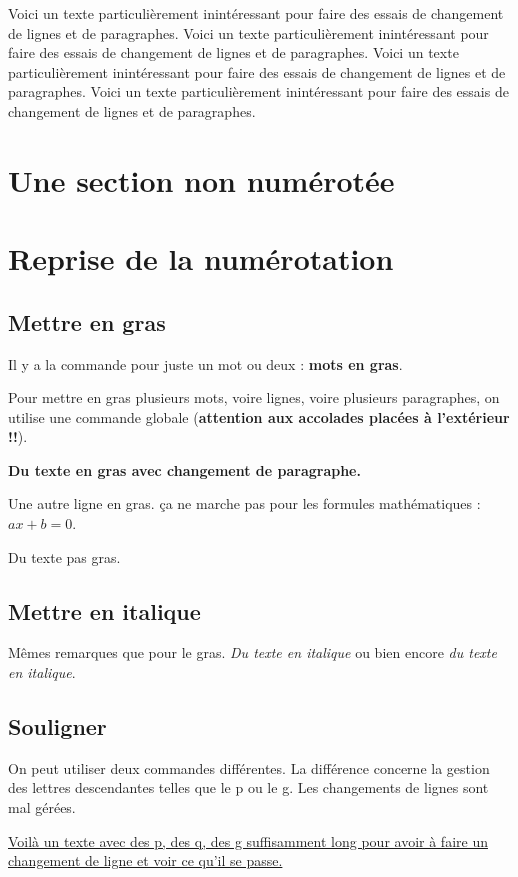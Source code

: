 \documentclass[10pt,frenchb]{book} %
\begin{document}
\noindent Voici un texte particulièrement inintéressant pour faire des essais de changement de lignes et de paragraphes. Voici un texte particulièrement inintéressant pour faire des essais de changement de lignes et de paragraphes. Voici un texte particulièrement inintéressant pour faire des essais de changement de lignes et de paragraphes. Voici un texte particulièrement inintéressant pour faire des essais de changement de lignes et de paragraphes. %

\section*{Une section non numérotée}

\section{Reprise de la numérotation}
\subsection{Mettre en gras}

Il y a la commande pour juste un mot ou deux : \textbf{mots en gras}.

Pour mettre en gras plusieurs mots, voire lignes, voire plusieurs paragraphes, on utilise une commande globale (\textbf{attention aux accolades placées à l'extérieur !!}).

{\bfseries
Du texte en gras avec changement de paragraphe.\par
Une autre ligne en gras. ça ne marche pas pour les formules mathématiques : $ax + b = 0$.
} Du texte pas gras. %

\subsection{Mettre en italique}

Mêmes remarques que pour le gras. \textit{Du texte en italique} ou bien encore {\itshape du texte en italique}.

\subsection{Souligner}

On peut utiliser deux commandes différentes. La différence concerne la gestion des lettres descendantes telles que le p ou le g. Les changements de lignes sont mal gérées.\par
\underline{Voilà un texte avec des p, des q, des g suffisamment long pour avoir à faire un changement de ligne et voir ce qu'il se passe.}\par
{}\par
\end{document}
